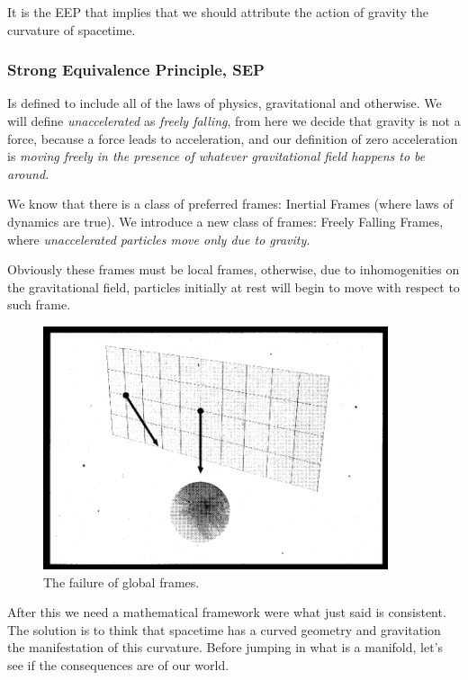 It is the EEP that implies that we should attribute the action of gravity the curvature of spacetime.

\subsubsection{Strong Equivalence Principle, SEP}
Is defined to include all of the laws of physics, gravitational and otherwise.
We will define \emph{unaccelerated} as \emph{freely falling}, from here we decide that gravity is not a force, because a force leads to acceleration, and our definition of zero acceleration is \emph{ moving freely in the presence of whatever gravitational field happens to be around.} \par

We know that there is a class of preferred frames: Inertial Frames (where laws of dynamics are true).
We introduce a new class of frames: Freely Falling Frames, where \emph{ unaccelerated particles move only due to gravity.} \par
Obviously these frames must be local frames, otherwise, due to inhomogenities on the gravitational field, particles initially at rest will begin to move with respect to such frame.
\begin{figure}[h]
\centering
\includegraphics[width=0.8\linewidth]{imm/failureglobal.png}
\caption{The failure of global frames.}
\label{imm:failureglobal}
\end{figure}

After this we need a mathematical framework were what just said is consistent. The solution is to think that spacetime has a curved geometry and gravitation the manifestation of this curvature.
Before jumping in what is a manifold, let's see if the consequences are of our world.

